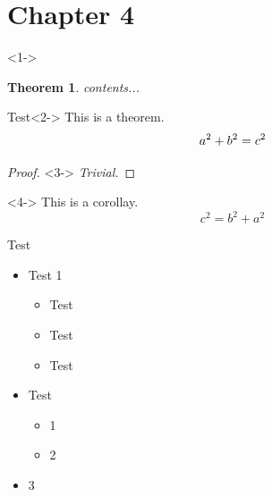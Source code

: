 \documentclass{beamer}
\newtheorem{thm}{Theorem}[theorem]
\begin{document}
	\section{Chapter 4}	
	
	\begin{frame}<1->
		 \begin{thm}
	        contents...
	        \label{thm-1}
		 \end{thm}
		\begin{block}{Test}<2->
            This is a theorem.
            \begin{equation}
                a^2 + b^2 = c^2
            	\notag	
            	\label{equ-3}
            	\end{equation}
        \end{block}
    	
		\begin{proof}<3->
            \textit{Trivial.} 
        \end{proof}
		            
        \begin{corollary}<4->
            This is a corollay.
            \begin{equation}
                c^2 = b^2 + a^2
                \label{equ-4}
            \end{equation}
        \end{corollary}
	\end{frame}
	
	\begin{frame}{Test}
		\begin{itemize}
			\item Test 1
			\begin{itemize}
				\item Test
				\item Test
				\item Test 
			\end{itemize}
			\item Test
			\begin{itemize}
				\item 1
				\item 2
			\end{itemize}
		\item 3
		\end{itemize}
		
	\end{frame}

%		
%			
%				
		
	
\end{document}
